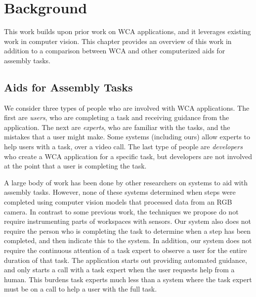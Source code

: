 \chapter{Background}\label{chap:background}

This work builds upon prior work on WCA applications, and it leverages
existing work in computer vision.
This chapter provides an overview of this work in addition to a comparison
between WCA and other computerized aids for assembly tasks.

\section{Aids for Assembly Tasks}\label{sec:existing_aids}

We consider three types of people who are involved with WCA applications.
The first are \emph{users}, who are completing a task and receiving guidance
from the application.
The next are \emph{experts}, who are familiar with the tasks, and the mistakes
that a user might make.
Some systems (including ours) allow experts to help users with a task, over a
video call.
The last type of people are \emph{developers} who create a WCA application for
a specific task, but developers are not involved at the point that a user
is completing the task.

A large body of work has been done by other researchers on systems to aid with
assembly tasks.
However, none of these systems determined when steps were completed using
computer vision models that processed data from an RGB camera.
In contrast to some previous work, the techniques we
propose do not require instrumenting parts of workspaces with sensors.
Our system also does not require the person who is completing the task to
determine when a step has been completed, and then indicate this to the system.
In addition, our system does not require the continuous attention of a task
expert to observe a user for the entire duration of that task.
The application starts out providing automated guidance, and only starts a call
with a task expert when the user requests help from a human.
This burdens task experts much less than a system where the task expert must be
on a call to help a user with the full task.

